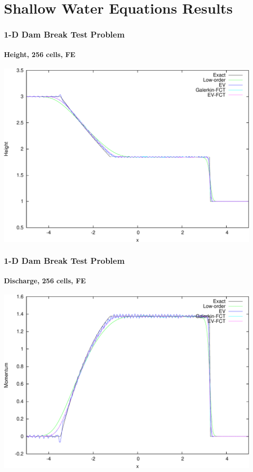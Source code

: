 \section{Shallow Water Equations Results}
\begin{frame}
\frametitle{1-D Dam Break Test Problem}
\framesubtitle{Height, 256 cells, FE}

\begin{center}
\includegraphics[height=0.8\textheight]{./figures/dambreak1d_Height_FE_256cells.pdf}
\end{center}

\end{frame}
\begin{frame}
\frametitle{1-D Dam Break Test Problem}
\framesubtitle{Discharge, 256 cells, FE}

\begin{center}
\includegraphics[height=0.8\textheight]{./figures/dambreak1d_Momentum_FE_256cells.pdf}
\end{center}

\end{frame}
